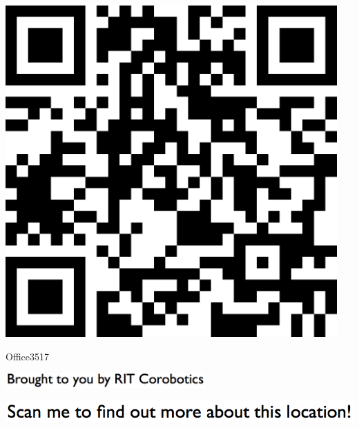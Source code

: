 \documentclass[letterpaper]{article}
\begin{document}
 \begingroup 
 \centerline{\includegraphics[scale=1,width=5in,height=5in]{Office3517.png}} 
 \endgroup 
 \vspace*{\fill} 

 \hfill{\small Office3517} 

  \vspace{0.7in} 
 
 \centerline{\includegraphics[scale=1,width=3in]{text-bottom.png}} 
 
 \pagebreak 
{} 
 \vspace*{\fill} 
 
  \centerline{\includegraphics[scale=1,width=6in]{text-top.png}} 
 
 \vspace{0.5in} 
 
\end{document}
